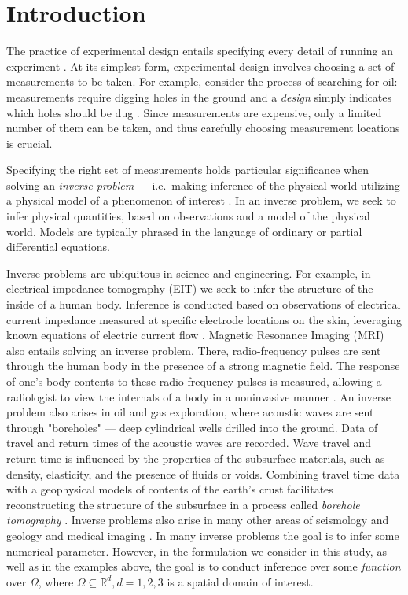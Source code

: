\section{Introduction}\label{section:intro}
The practice of experimental design entails specifying every detail of
running an experiment \cite{chaloner1995}. At its simplest form,
experimental design involves choosing a set of measurements to be
taken. For example, consider the process of searching for oil:
measurements require digging holes in the ground and a \emph{design}
simply indicates which holes should be dug
\cite{horesh2008borehole}. Since measurements are expensive, only a
limited number of them can be taken, and thus carefully choosing
measurement locations is crucial.

Specifying the right set of measurements holds particular significance
when solving an \emph{inverse problem} --- i.e.~making inference of
the physical world utilizing a physical model of a phenomenon of
interest \cite{tarantola2005,kaipio2005}. In an inverse problem, we
seek to infer physical quantities, based on observations and a model
of the physical world. Models are typically phrased in the language of
ordinary or partial differential equations.

Inverse problems are ubiquitous in science and engineering. For
example, in electrical impedance tomography (EIT) we seek to infer the
structure of the inside of a human body. Inference is conducted based
on observations of electrical current impedance measured at specific
electrode locations on the skin, leveraging known equations of
electric current flow \cite{horesh2010impedance}. Magnetic Resonance
Imaging (MRI) also entails solving an inverse problem. There,
radio-frequency pulses are sent through the human body in the presence
of a strong magnetic field. The response of one's body contents to
these radio-frequency pulses is measured, allowing a radiologist to
view the internals of a body in a noninvasive manner
\cite{horesh2008mri}. An inverse problem also arises in oil and gas
exploration, where acoustic waves are sent through "boreholes" ---
deep cylindrical wells drilled into the ground. Data of travel and
return times of the acoustic waves are recorded. Wave travel and
return time is influenced by the properties of the subsurface
materials, such as density, elasticity, and the presence of fluids or
voids. Combining travel time data with a geophysical models of
contents of the earth's crust facilitates reconstructing the structure
of the subsurface in a process called \emph{borehole tomography}
\cite{horesh2008borehole}. Inverse problems also arise in many other
areas of seismology and geology \cite{rabinowitz1990, steinberg1995}
and medical imaging \cite{tarantola2005}. In many inverse problems the
goal is to infer some numerical parameter. However, in the formulation
we consider in this study, as well as in the examples above, the goal
is to conduct inference over some \emph{function} over $\Omega$, where
\(\Omega \subseteq \mathbb{R}^d, d=1,2,3\) is a spatial domain of
interest.

